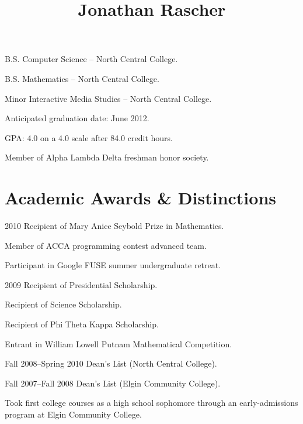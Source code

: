 \documentclass[11pt]{simplecv}
\begin{document}
  \leftheader{
    \contactemail \\
    \contactphone
  }

  \rightheader{
    \contactaddressone \\
    \contactaddresstwo
  }

  \title{Jonathan Rascher}
  \maketitle

  \begin{topic}
    \item[B.S.] Computer Science -- North Central College.

    \item[B.S.] Mathematics -- North Central College.

    \item[Minor] Interactive Media Studies -- North Central College.

    \item Anticipated graduation date: June 2012.

    \item GPA: 4.0 on a 4.0 scale after 84.0 credit hours.

    \item Member of Alpha Lambda Delta freshman honor society.
  \end{topic}

  \section{Academic Awards \& Distinctions}
  \begin{topic}
    \item[2010] Recipient of Mary Anice Seybold Prize in Mathematics.

    Member of ACCA programming contest advanced team.

    Participant in Google FUSE summer undergraduate retreat.

    \item[2009] Recipient of Presidential Scholarship.

    Recipient of Science Scholarship.

    Recipient of Phi Theta Kappa Scholarship.

    Entrant in William Lowell Putnam Mathematical Competition.

    \item[Fall 2008--Spring 2010] Dean's List (North Central College).

    \item[Fall 2007--Fall 2008] Dean's List (Elgin Community College).

    \item Took first college courses as a high school sophomore through an early-admissions program at Elgin Community College.
  \end{topic}
\end{document}
